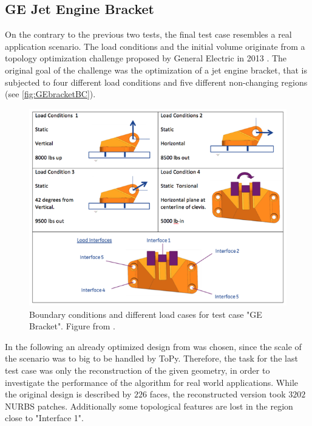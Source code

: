 \subsection{GE Jet Engine Bracket}
\label{ssec:bracket}
On the contrary to the previous two tests, the final test case resembles a real application scenario. The load conditions and the initial volume originate from a topology optimization challenge proposed by General Electric in 2013 \cite{GEBracket}. The original goal of the challenge was the optimization of a jet engine bracket, that is subjected to four different load conditions and five different non-changing regions (see \autoref{fig:GEbracketBC}).
\begin{figure}[H]
\begin{center}
\includegraphics[scale = 0.4]{Pictures/GEbracket.png}
\end{center}
\caption{Boundary conditions and different load cases for test case "GE Bracket". Figure from \cite{GEBracket}.}
\label{fig:GEbracketBC}
\end{figure}
In the following an already optimized design from \cite{GEBracketTripon} was chosen, since the scale of the scenario was to big to be handled by ToPy. Therefore, the task for the last test case was only the reconstruction of the given geometry, in order to investigate the performance of the algorithm for real world applications. While the original design is described by $226$ faces, the reconstructed version took $3202$ NURBS patches. Additionally some topological features are lost in the region close to "Interface 1".
\enlargethispage{2cm}
